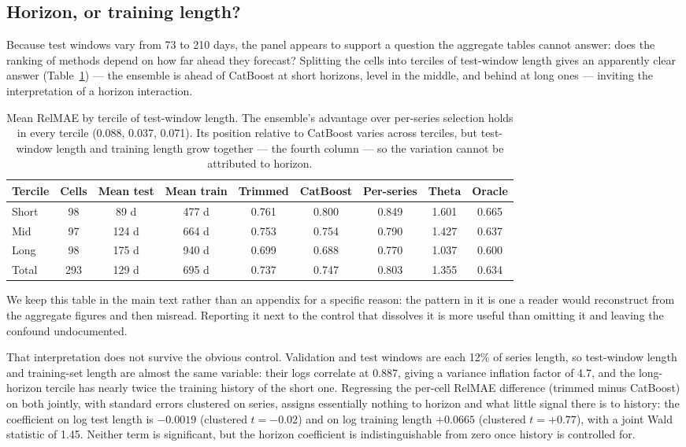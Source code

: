 \documentclass[11pt]{article}
\begin{document}
\subsection{Horizon, or training length?}

Because test windows vary from 73 to 210 days, the panel appears to support a question the aggregate tables cannot answer: does the ranking of methods depend on how far ahead they forecast? Splitting the cells into terciles of test-window length gives an apparently clear answer (Table~\ref{tab:horizon}) --- the ensemble is ahead of CatBoost at short horizons, level in the middle, and behind at long ones --- inviting the interpretation of a horizon interaction.

\begin{table}[htbp]\centering\small
\caption{Mean RelMAE by tercile of test-window length. The ensemble's advantage over per-series selection holds in every tercile (0.088, 0.037, 0.071). Its position relative to CatBoost varies across terciles, but test-window length and training length grow together --- the fourth column --- so the variation cannot be attributed to horizon.}
\label{tab:horizon}
\begin{tabular}{lcccccccc}
\toprule
Tercile & Cells & Mean test & Mean train & Trimmed & CatBoost & Per-series & Theta & Oracle \\
\midrule
Short & 98 & 89 d & 477 d & 0.761 & 0.800 & 0.849 & 1.601 & 0.665 \\
Mid & 97 & 124 d & 664 d & 0.753 & 0.754 & 0.790 & 1.427 & 0.637 \\
Long & 98 & 175 d & 940 d & 0.699 & 0.688 & 0.770 & 1.037 & 0.600 \\
\midrule
Total & 293 & 129 d & 695 d & 0.737 & 0.747 & 0.803 & 1.355 & 0.634 \\
\bottomrule
\end{tabular}
\end{table}

We keep this table in the main text rather than an appendix for a specific reason: the pattern in it is one a reader would reconstruct from the aggregate figures and then misread. Reporting it next to the control that dissolves it is more useful than omitting it and leaving the confound undocumented.

That interpretation does not survive the obvious control. Validation and test windows are each 12\% of series length, so test-window length and training-set length are almost the same variable: their logs correlate at 0.887, giving a variance inflation factor of 4.7, and the long-horizon tercile has nearly twice the training history of the short one. Regressing the per-cell RelMAE difference (trimmed minus CatBoost) on both jointly, with standard errors clustered on series, assigns essentially nothing to horizon and what little signal there is to history: the coefficient on log test length is $-0.0019$ (clustered $t = -0.02$) and on log training length $+0.0665$ (clustered $t = +0.77$), with a joint Wald statistic of 1.45. Neither term is significant, but the horizon coefficient is indistinguishable from zero once history is controlled for.
\end{document}
